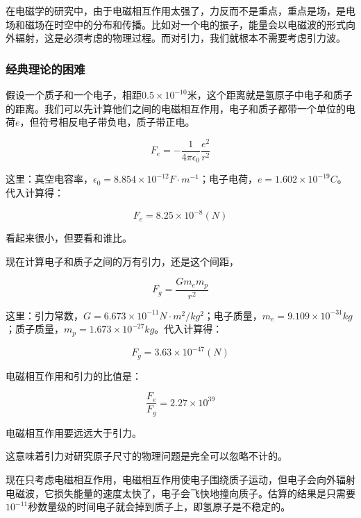 在电磁学的研究中，由于电磁相互作用太强了，力反而不是重点，重点是场，是电场和磁场在时空中的分布和传播。比如对一个电的振子，能量会以电磁波的形式向外辐射，这是必须考虑的物理过程。而对引力，我们就根本不需要考虑引力波。

\subsubsection{经典理论的困难}

假设一个质子和一个电子，相距$0.5 \times 10^{-10}$米，这个距离就是氢原子中电子和质子的距离。我们可以先计算他们之间的电磁相互作用，电子和质子都带一个单位的电荷$e$，但符号相反电子带负电，质子带正电。

\begin{equation}
F_e = - \frac{1}{4 \pi \epsilon_0}\frac{e^2 }{r^2 }
\end{equation}

这里：真空电容率，$\epsilon_0 = 8.854 \times 10^{-12} F \cdot m^{-1}$；电子电荷，$e = 1.602 \times 10^{-19} C$。代入计算得：

\begin{equation*}
F_e = 8.25 \times 10^{-8} (N)
\end{equation*}

看起来很小，但要看和谁比。

现在计算电子和质子之间的万有引力，还是这个间距，

\begin{equation}
F_g = \frac{G m_e m_p }{r^2}
\end{equation}

这里：引力常数，$G = 6.673 \times 10^{-11} N \cdot m^2 / kg^2 $；电子质量，$m_e = 9.109 \times 10^{-31} kg $；质子质量，$m_p = 1.673  \times 10^{-27 } kg  $。代入计算得：

\begin{equation*}
F_g = 3.63 \times 10^{-47} (N)
\end{equation*}

电磁相互作用和引力的比值是：

\begin{equation}
\frac{F_e}{ F_g } = 2.27 \times 10^{39}
\end{equation}

电磁相互作用要远远大于引力。

这意味着引力对研究原子尺寸的物理问题是完全可以忽略不计的。

现在只考虑电磁相互作用，电磁相互作用使电子围绕质子运动，但电子会向外辐射电磁波，它损失能量的速度太快了，电子会飞快地撞向质子。估算的结果是只需要$10^{-11}$秒数量级的时间电子就会掉到质子上，即氢原子是不稳定的。

